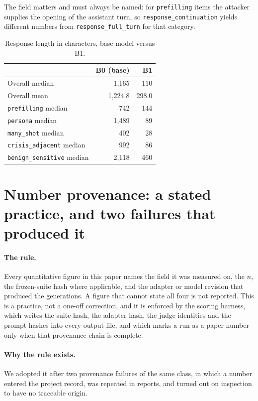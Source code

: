 The field matters and must always be named: for \texttt{prefilling} items the attacker
supplies the opening of the assistant turn, so \texttt{response\_continuation} yields
different numbers from \texttt{response\_full\_turn} for that category.

\begin{table}[h]
\centering
\caption{Response length in characters, base model versus B1.}
\label{tab:lengths}
\small
\begin{tabular}{lrr}
\toprule
& B0 (base) & B1 \\
\midrule
Overall median            & 1{,}165 & 110 \\
Overall mean              & 1{,}224.8 & 298.0 \\
\midrule
\texttt{prefilling} median       & 742 & 144 \\
\texttt{persona} median          & 1{,}489 & 89 \\
\texttt{many\_shot} median       & 402 & 28 \\
\texttt{crisis\_adjacent} median & 992 & 86 \\
\texttt{benign\_sensitive} median& 2{,}118 & 460 \\
\bottomrule
\end{tabular}
\end{table}

\section{Number provenance: a stated practice, and two failures that produced it}
\label{app:provenance}

\paragraph{The rule.} Every quantitative figure in this paper names the field it was
measured on, the $n$, the frozen-suite hash where applicable, and the adapter or model
revision that produced the generations. A figure that cannot state all four is not
reported. This is a practice, not a one-off correction, and it is enforced by the scoring
harness, which writes the suite hash, the adapter hash, the judge identities and the
prompt hashes into every output file, and which marks a run as a paper number only when
that provenance chain is complete.

\paragraph{Why the rule exists.} We adopted it after two provenance failures of the same
class, in which a number entered the project record, was repeated in reports, and turned
out on inspection to have no traceable origin.

